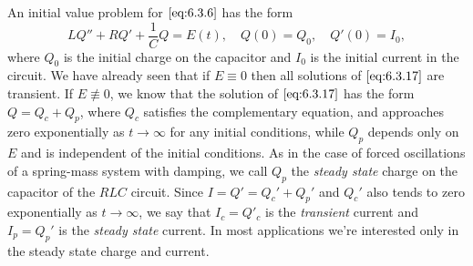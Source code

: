 \documentclass{ximera}
\begin{document}
An initial value problem for $\eqref{eq:6.3.6}$  has the form
\begin{equation} \label{eq:6.3.17}
 LQ''+RQ'+\frac{1}{C}Q=E(t),\quad Q(0)=Q_0,\quad Q'(0)=I_0,
\end{equation}
where $Q_0$ is the initial charge on the capacitor and $I_0$ is the
initial current in the circuit. We have already seen that if $E\equiv0$
then all solutions of $\eqref{eq:6.3.17}$ are transient. If
$E\not\equiv0$, we know that the solution of $\eqref{eq:6.3.17}$ has the form $Q=Q_c+Q_p$, where $Q_c$ satisfies the complementary
equation, and approaches zero exponentially as $t\rightarrow\infty$ for any
initial conditions, while $Q_p$ depends only on $E$ and is
independent of the initial conditions. As in the case of forced
oscillations of a spring-mass system with damping, we call $Q_p$ the \textit{steady state} charge on the capacitor of the $RLC$ circuit. Since
$I=Q'=Q_c'+Q_p'$ and $Q_c'$ also tends to zero exponentially as
$t\rightarrow\infty$, we say that $I_c=Q'_c$ is the \textit{transient} current
and $I_p=Q_p'$ is the \textit{steady state} current. In most
applications we're interested only in the steady state charge and
current.
\end{document}
